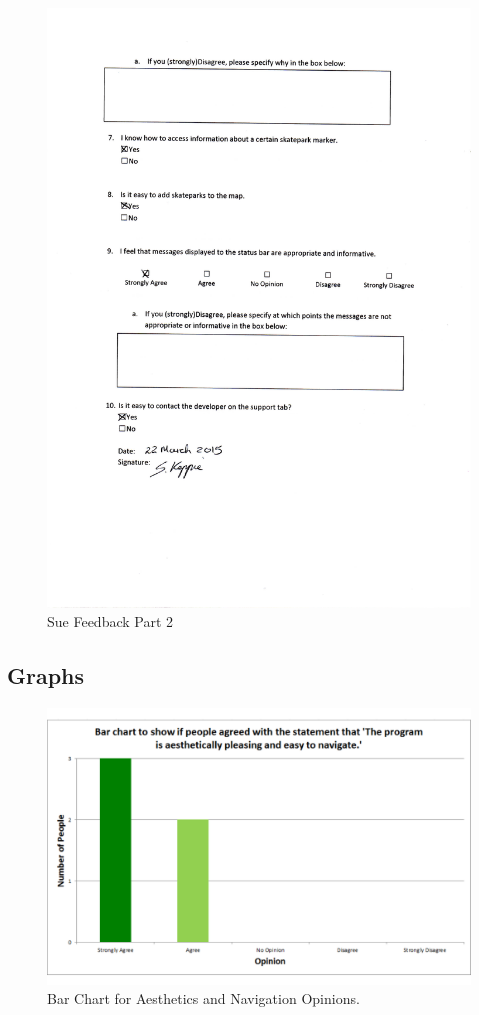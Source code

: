 \begin{figure}[H]
    \includegraphics[width=\textwidth]{./Evaluation/images/SueFeedback2.pdf}
    \caption{Sue Feedback Part 2} \label{fig:SueFeedback2}
\end{figure}



\subsection{Graphs}

\begin{figure}[H]
    \includegraphics[width=\textwidth]{./Evaluation/images/AestheticsGraph.pdf}
    \caption{Bar Chart for Aesthetics and Navigation Opinions.} \label{fig:AestheticsGraph}
\end{figure}

